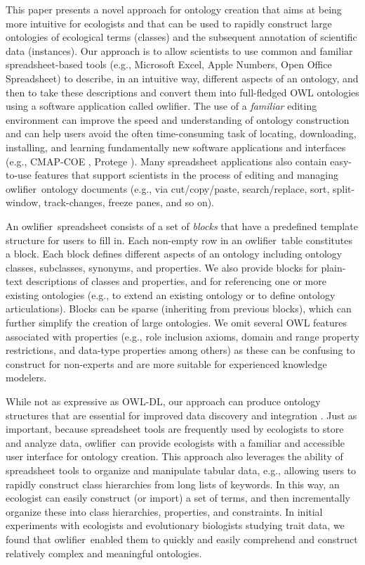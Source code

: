 \documentclass[5p,authoryear]{elsarticle}
\newcommand{\owlifier}{\textsf{owlifier}}
\begin{document}
This paper presents a novel approach for ontology creation that aims
at being more intuitive for ecologists and that can be used to rapidly
construct large ontologies of ecological terms (classes) and the
subsequent annotation of scientific data (instances).  Our approach is
to allow scientists to use common and familiar spreadsheet-based tools
(e.g., Microsoft Excel, Apple Numbers, Open Office Spreadsheet) to
describe, in an intuitive way, different aspects of an ontology, and
then to take these descriptions and convert them into full-fledged OWL
ontologies using a software application called \owlifier. The use of a
\emph{familiar} editing environment can improve the speed and
understanding of ontology construction and can help users avoid the
often time-consuming task of locating, downloading, installing, and
learning fundamentally new software applications and interfaces (e.g.,
CMAP-COE \citep{hayes05:_collab_knowl_captur_in_ontol}, Protege
\citep{knublauch04:_editin_descr_logic_ontol_with}).  Many spreadsheet
applications also contain easy-to-use features that support scientists
in the process of editing and managing \owlifier\ ontology documents
(e.g., via cut/copy/paste, search/replace, sort, split-window,
track-changes, freeze panes, and so on).

An \owlifier\ spreadsheet consists of a set of \emph{blocks} that have
a predefined template structure for users to fill in. Each non-empty
row in an \owlifier\ table constitutes a block. Each block defines
different aspects of an ontology including ontology classes,
subclasses, synonyms, and properties.  We also provide blocks for
plain-text descriptions of classes and properties, and for referencing
one or more existing ontologies (e.g., to extend an existing ontology
or to define ontology articulations). Blocks can be sparse (inheriting
from previous blocks), which can further simplify the creation of
large ontologies. We omit several OWL features associated with
properties (e.g., role inclusion axioms, domain and range property
restrictions, and data-type properties among others) as these can be
confusing to construct for non-experts and are more suitable for
experienced knowledge modelers.

While not as expressive as OWL-DL, our approach can produce ontology
structures that are essential for improved data discovery and
integration \citep{madin07:_ontol_for_descr_and_synth}. Just as
important, because spreadsheet tools are frequently used by ecologists
to store and analyze data, \owlifier\ can provide ecologists with a
familiar and accessible user interface for ontology creation. This
approach also leverages the ability of spreadsheet tools to organize
and manipulate tabular data, e.g., allowing users to rapidly construct
class hierarchies from long lists of keywords.  In this way, an
ecologist can easily construct (or import) a set of terms, and then
incrementally organize these into class hierarchies, properties, and
constraints. In initial experiments with ecologists and evolutionary
biologists studying trait data, we found that \owlifier\ enabled them
to quickly and easily comprehend and construct relatively complex and
meaningful ontologies.
\end{document}

